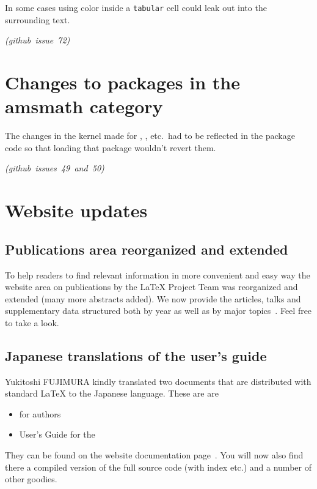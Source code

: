 \documentclass{ltnews}
\newcommand\githubissue[2][]{\ifhmode\unskip\fi
     \quad\penalty500\strut\nobreak\hfill
     \mbox{\small\itshape(github issue#1 #2)}\par}
\newcommand\env[1]{\texttt{#1}}
\begin{document}
In some cases using color inside a \env{tabular} cell could leak out
into the surrounding text.
%
\githubissue{72}



\section{Changes to packages in the amsmath category}

The changes in the kernel made for , ,
etc.\ had to be reflected in the  package code so that
loading that package wouldn't revert them.
%
\githubissue[s]{49 and 50}





\section{Website updates}

\subsection{Publications area reorganized and extended}

To help readers to find relevant information in more convenient and
easy way the website area on publications by the \LaTeX{} Project Team
was reorganized and extended (many more abstracts added). We now
provide the articles, talks and supplementary data structured both by
year as well as by major topics~\cite{site-pub}. Feel free to take a
look.

\subsection{Japanese translations of the user's guide}

Yukitoshi FUJIMURA kindly translated two documents that are
distributed with standard \LaTeX{} to the Japanese language. These are
are
\begin{itemize}
\item
    \LaTeXe{} for authors
\item
    User’s Guide for the ~\cite{amsldoc}
\end{itemize}
They can be found on the website documentation page~\cite{site-doc}.
You will now also find there a compiled version of the full \LaTeXe{}
source code (with index etc.\@) and a number of other goodies.
\end{document}
